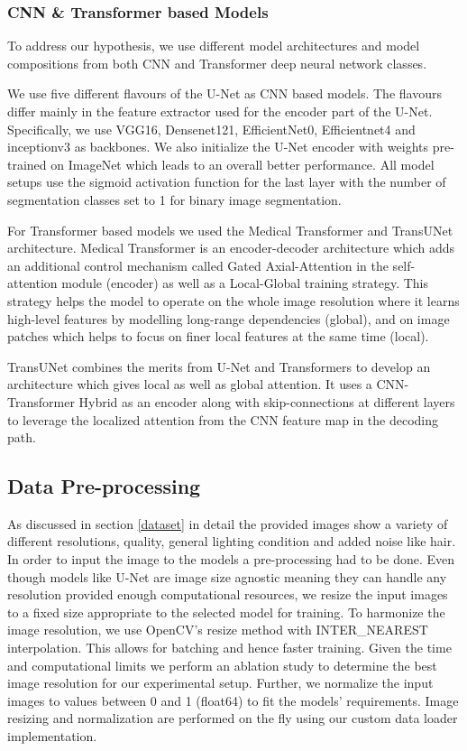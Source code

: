 \subsubsection{CNN \& Transformer based Models}

To address our hypothesis, we use different model architectures and model compositions from both CNN and Transformer deep neural network classes.

\par
We use five different flavours of the U-Net as CNN based models. The flavours differ mainly in the feature extractor used for the encoder part of the U-Net. Specifically, we use VGG16, Densenet121, EfficientNet0, Efficientnet4 and inceptionv3 as backbones. We also initialize the U-Net encoder with weights pre-trained on ImageNet which leads to an overall better performance. All model setups use the sigmoid activation function for the last layer with the number of segmentation classes set to 1  for binary image segmentation.

\par
For Transformer based models we used the Medical Transformer and TransUNet architecture. Medical Transformer is an encoder-decoder architecture which adds an additional control mechanism called Gated Axial-Attention in the self-attention module (encoder) as well as a Local-Global training strategy. This strategy helps the model to operate on the whole image resolution where it learns high-level features by modelling long-range dependencies (global), and on image patches which helps to focus on finer local features at the same time (local).

\par
TransUNet combines the merits from U-Net and Transformers to develop an architecture which gives local as well as global attention. It uses a CNN-Transformer Hybrid as an encoder along with skip-connections at different layers to leverage the localized attention from the CNN feature map in the decoding path.


\subsection{Data Pre-processing}
As discussed in section \ref{dataset} in detail the provided images show a variety of different resolutions, quality, general lighting condition and added noise like hair. In order to input the image to the models a pre-processing had to be done. Even though models like U-Net are image size agnostic meaning they can handle any resolution provided enough computational resources, we resize the input images to a fixed size appropriate to the selected model for training. To harmonize the image resolution, we use OpenCV’s resize method with INTER\_NEAREST interpolation. This allows for batching and hence faster training. Given the time and computational limits we perform an ablation study to determine the best image resolution for our experimental setup. Further, we normalize the input images to values between 0 and 1 (float64) to fit the models’ requirements. Image resizing and normalization are performed on the fly using our custom data loader implementation.



